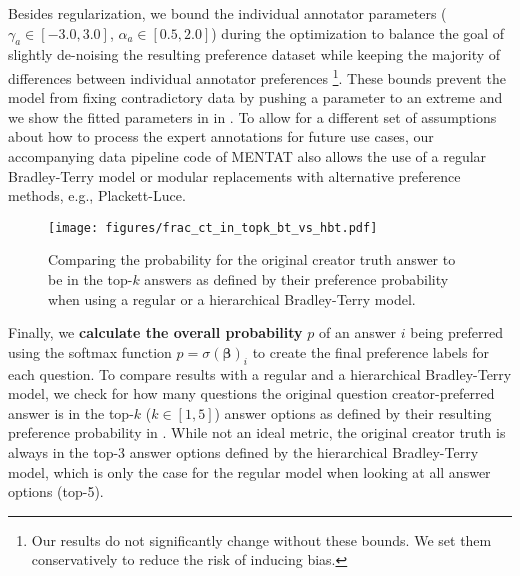 Besides regularization, we bound the individual annotator parameters ($\gamma_a \in [-3.0, 3.0]$, $\alpha_a \in [0.5, 2.0]$) during the optimization to balance the goal of slightly de-noising the resulting preference dataset while keeping the majority of differences between individual annotator preferences \footnote{Our results do not significantly change without these bounds. We set them conservatively to reduce the risk of inducing bias.}.
These bounds prevent the model from fixing contradictory data by pushing a parameter to an extreme and we show the fitted parameters in  in .
To allow for a different set of assumptions about how to process the expert annotations for future use cases, our accompanying data pipeline code of MENTAT also allows the use of a regular Bradley-Terry model or modular replacements with alternative preference methods, e.g., Plackett-Luce.

\begin{figure}[ht]
    \vskip 0.2in
    \begin{center}
    \centerline{\texttt{[image: figures/frac\_ct\_in\_topk\_bt\_vs\_hbt.pdf]}}
    \caption{Comparing the probability for the original creator truth answer to be in the top-$k$ answers as defined by their preference probability when using a regular or a hierarchical Bradley-Terry model.}
    \label{fig:frac_ct_in_topk_bt_vs_hbt}
    \end{center}
    \vskip -0.2in
\end{figure}

Finally, we \textbf{calculate the overall probability} $p$ of an answer $i$ being preferred using the softmax function $p = \sigma(\boldsymbol{\beta})_i$ to create the final preference labels for each question.
To compare results with a regular and a hierarchical Bradley-Terry model, we check for how many questions the original question creator-preferred answer is in the top-$k$ ($k \in [1, 5]$) answer options as defined by their resulting preference probability in .
While not an ideal metric, the original creator truth is always in the top-3 answer options defined by the hierarchical Bradley-Terry model, which is only the case for the regular model when looking at all answer options (top-5).


